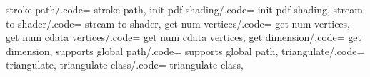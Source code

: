 {	%
	stroke path/.code=
		{\expandafter\def\csname pgfpptch\pgfplotsdeclarepatchclass@ stroke path},%
	init pdf shading/.code=
		{\expandafter\def\csname pgfpptch\pgfplotsdeclarepatchclass@ init pdf shading},%
	stream to shader/.code=
		{\expandafter\def\csname pgfpptch\pgfplotsdeclarepatchclass@ stream to shader},%
	get num vertices/.code=
		{\expandafter\def\csname pgfpptch\pgfplotsdeclarepatchclass@ get num vertices},%
	get num cdata vertices/.code=
		{\expandafter\def\csname pgfpptch\pgfplotsdeclarepatchclass@ get num cdata vertices},%
	get dimension/.code=
		{\expandafter\def\csname pgfpptch\pgfplotsdeclarepatchclass@ get dimension},%
	supports global path/.code=
		{\expandafter\def\csname pgfpptch\pgfplotsdeclarepatchclass@ supports global path},%
	triangulate/.code=
		{\expandafter\def\csname pgfpptch\pgfplotsdeclarepatchclass@ triangulate},%
	triangulate class/.code=
		{\expandafter\def\csname pgfpptch\pgfplotsdeclarepatchclass@ triangulate class},%
}

